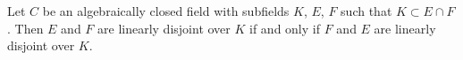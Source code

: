 Let $C$ be an algebraically closed field with subfields $K$, $E$, $F$ such that $K \subset E \cap F$.
Then $E$ and $F$ are linearly disjoint over $K$ if and only if $F$ and $E$ are linearly disjoint over $K$.
